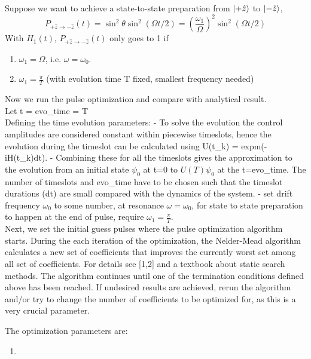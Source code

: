 \documentclass[12pt]{report}
\begin{document}
Suppose we want to achieve a state-to-state preparation from $\ket{+\hat{z}}$ to $\ket{-\hat{z}}$,  
$$
P_{+\hat{z} \rightarrow-\hat{z}}(t) = \sin ^2 \theta \sin ^2(\Omega t / 2)=\left(\frac{\omega_1}{\Omega}\right)^2 \sin ^2(\Omega t / 2)
$$
With $H_1(t)$, $P_{+\hat{z} \rightarrow-\hat{z}}(t)$ only goes to 1 if 
\begin{enumerate}
    \item $\omega_1 = \Omega$, i.e. $\omega = \omega_0$.
    \item $\omega_1 = \frac{\pi}{T}$ (with evolution time T fixed, smallest frequency needed)
\end{enumerate}
Now we run the pulse optimization and compare with analytical result.
\\
Let t = evo\_time = T
\\
Defining the time evolution parameters:
- To solve the evolution the control amplitudes are considered constant within piecewise timeslots, hence the evolution during the timeslot can be calculated using U(t\_k) = expm(-iH(t\_k)dt). 
- Combining these for all the timeslots gives the approximation to the evolution from an initial state $\psi_0$ at t=0 to $U(T)\psi_0$ at the t=evo\_time. The number of timeslots and evo\_time have to be chosen such that the timeslot durations (dt) are small compared with the dynamics of the system.
- set drift frequency $\omega_0$ to some number, at resonance $\omega = \omega_0$, for state to state preparation to happen at the end of pulse, require $\omega_1 = \frac{\pi}{T}$.
\\
Next, we set the initial guess pulses where the pulse optimization algorithm starts. 
During the each iteration of the optimization, the Nelder-Mead algorithm calculates a new set of coefficients that improves the currently worst set among all set of coefficients. For details see [1,2] and a textbook about static search methods. 
The algorithm continues until one of the termination conditions defined above has been reached. If undesired results are achieved, rerun the algorithm and/or try to change the number of coefficients to be optimized for, as this is a very crucial parameter.  

The optimization parameters are: 
\begin{enumerate}
    \item 
\end{enumerate}
\end{document}
